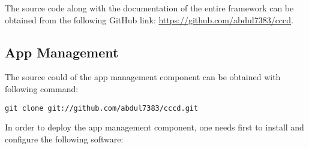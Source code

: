 The source code along with the documentation of the entire framework can be obtained from the following GitHub link: \url{https://github.com/abdul7383/cccd}.

\subsection{App Management\label{sec:eval_te_en_app}}
The source could of the app management component can be obtained with following command:
\begin{code}
\begin{verbatim}
git clone git://github.com/abdul7383/cccd.git
\end{verbatim}
\end{code}

In order to deploy the app management component, one needs first to install and configure the following software:

